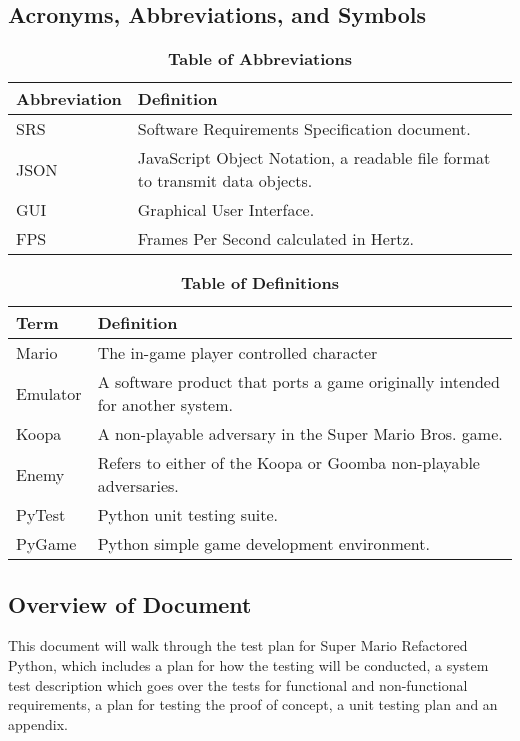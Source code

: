 \documentclass[12pt, titlepage]{article}
\begin{document}
\subsection{Acronyms, Abbreviations, and Symbols}
\begin{table}[hbp]
\caption{\textbf{Table of Abbreviations}} \label{Table}
\begin{tabularx}{\textwidth}{p{3cm}X}
\toprule
\textbf{Abbreviation} & \textbf{Definition} \\
\midrule
SRS & Software Requirements Specification document.\\
JSON & JavaScript Object Notation, a readable file format to transmit data objects.\\
GUI & Graphical User Interface.\\
FPS & Frames Per Second calculated in Hertz.\\
\bottomrule
\end{tabularx}
\end{table}

\begin{table}[!htbp]
\caption{\textbf{Table of Definitions}} \label{Table}
\begin{tabularx}{\textwidth}{p{3cm}X}
\toprule
\textbf{Term} & \textbf{Definition}\\
\midrule
Mario & The in-game player controlled character\\
Emulator & A software product that ports a game originally intended for another system.\\
Koopa & A non-playable adversary in the Super Mario Bros. game.\\
Enemy & Refers to either of the Koopa or Goomba non-playable adversaries.\\
PyTest & Python unit testing suite.\\
PyGame & Python simple game development environment.\\
\bottomrule
\end{tabularx}
\end{table}



\subsection{Overview of Document}
This document will walk through the test plan for Super Mario Refactored Python,
which includes a plan for how the testing will be conducted, a system test description
which goes over the tests for functional and non-functional requirements, a plan for testing
the proof of concept, a unit testing plan and an appendix.
\end{document}
